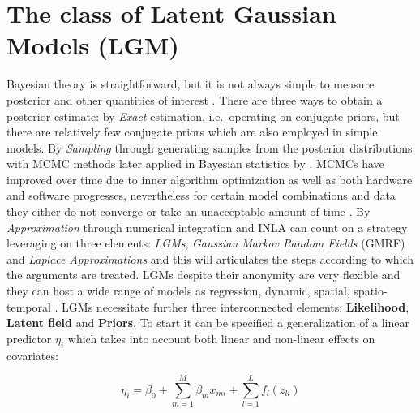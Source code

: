 \documentclass[
  12pt,
  a4paper,
  oneside]{book}
\theoremstyle{definition}
\theoremstyle{definition}
\theoremstyle{definition}
\theoremstyle{remark}
\begin{document}
\hypertarget{LGM}{%
\section{The class of Latent Gaussian Models (LGM)}\label{LGM}}

Bayesian theory is straightforward, but it is not always simple to measure posterior and other quantities of interest \citep{wang2018bayesian}. There are three ways to obtain a posterior estimate: by \emph{Exact} estimation, i.e.~operating on conjugate priors, but there are relatively few conjugate priors which are also employed in simple models. By \emph{Sampling} through generating samples from the posterior distributions with MCMC methods \citep{metropolis, hastings} later applied in Bayesian statistics by \citet{gelfand1990sampling}. MCMCs have improved over time due to inner algorithm optimization as well as both hardware and software progresses, nevertheless for certain model combinations and data they either do not converge or take an unacceptable amount of time \citeyearpar{wang2018bayesian}. By \emph{Approximation} through numerical integration and INLA can count on a strategy leveraging on three elements: \emph{LGMs}, \emph{Gaussian Markov Random Fields} (GMRF) and \emph{Laplace Approximations} and this will articulates the steps according to which the arguments are treated. LGMs despite their anonymity are very flexible and they can host a wide range of models as regression, dynamic, spatial, spatio-temporal \citep{Cameletti2012}. LGMs necessitate further three interconnected elements: \textbf{Likelihood}, \textbf{Latent field} and \textbf{Priors}.
To start it can be specified a generalization of a linear predictor \(\eta_{i}\) which takes into account both linear and non-linear effects on covariates:

\begin{equation}
  \eta_{i}=\beta_{0}+\sum_{m=1}^{M} \beta_{m} x_{m i}+\sum_{l=1}^{L} f_{l}\left(z_{l i}\right)
\label{eq:linearpredictor}
\end{equation}
\end{document}
